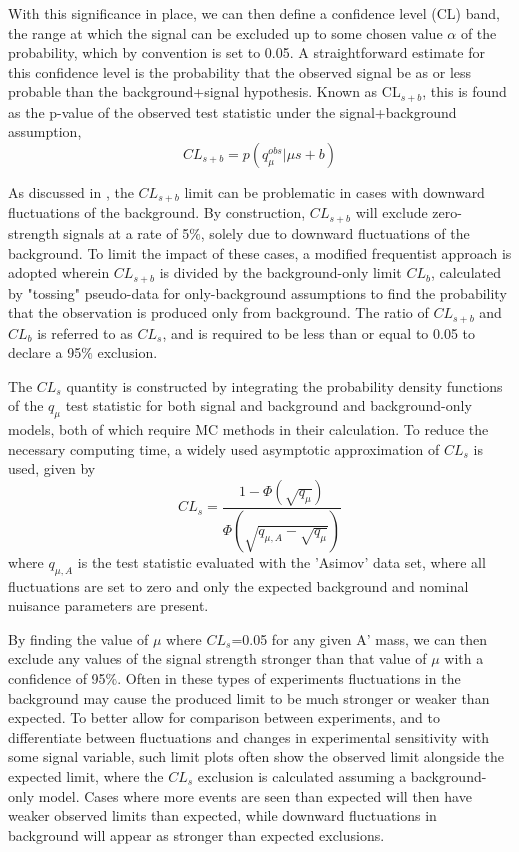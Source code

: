 With this significance in place, we can then define a confidence level (CL) band, the range at which the signal can be excluded up to some chosen value $\alpha$ of the probability, which by convention is set to 0.05.
A straightforward estimate for this confidence level is the probability that the observed signal be as or less probable than the background+signal hypothesis.
Known as CL$_{s+b}$, this is found as the p-value of the observed test statistic under the signal+background assumption,
\begin{equation}
	CL_{s+b} = p(q_{\mu}^{obs}|\mu s +b)
\end{equation}

As discussed in \cite{ATLAS:2011tau}, the $CL_{s+b}$ limit can be problematic in cases with downward fluctuations of the background. 
By construction, $CL_{s+b}$ will exclude zero-strength signals at a rate of 5$\%$, solely due to downward fluctuations of the background.
To limit the impact of these cases, a modified frequentist approach is adopted wherein $CL_{s+b}$ is divided by the background-only limit $CL_b$, calculated by "tossing" pseudo-data for only-background assumptions to find the probability that the observation is produced only from background.
The ratio of $CL_{s+b}$ and $CL_{b}$ is referred to as $CL_s$, and is required to be less than or equal to 0.05 to declare a 95$\%$ exclusion. 

The $CL_s$ quantity is constructed by integrating the probability density functions of the $q_\mu$ test statistic for both signal and background and background-only models, both of which require MC methods in their calculation. 
To reduce the necessary computing time, a widely used asymptotic approximation of $CL_s$ is used, given by
\begin{equation}
	CL_s = \frac{1-\Phi(\sqrt{q_\mu})}{\Phi(\sqrt{q_{\mu,A}-\sqrt{q_\mu}})}
\end{equation}
where $q_{\mu,A}$ is the test statistic evaluated with the 'Asimov' data set, where all fluctuations are set to zero and only the expected background and nominal nuisance parameters are present.

By finding the value of $\mu$ where $CL_s$=0.05 for any given A' mass, we can then exclude any values of the signal strength stronger than that value of $\mu$ with a confidence of 95$\%$. 
Often in these types of experiments fluctuations in the background may cause the produced limit to be much stronger or weaker than expected. 
To better allow for comparison between experiments, and to differentiate between fluctuations and changes in experimental sensitivity with some signal variable, such limit plots often show the observed limit alongside the expected limit, where the $CL_s$ exclusion is calculated assuming a background-only model.
Cases where more events are seen than expected will then have weaker observed limits than expected, while downward fluctuations in background will appear as stronger than expected exclusions.

